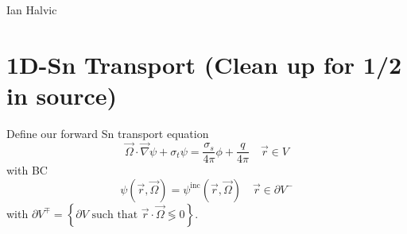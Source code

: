 \documentclass{article}
\newcommand{\vr}{\vec{r}}
\newcommand{\vO}{\vec{\Omega}}
\newcommand{\vgrad}{\vec{\nabla}}
\begin{document}
\begin{center}
Ian Halvic \\
\end{center}

\section{1D-Sn Transport (Clean up for 1/2 in source)}

Define our forward Sn transport equation
\[
\vO \cdot \vgrad \psi + \sigma_t \psi = \frac{\sigma_s}{4 \pi} \phi + \frac{q}{4 \pi} \quad \vr \in V
\]
with BC 
\[
\psi(\vr,\vO) = \psi^{\text{inc}}(\vr,\vO) \quad \vr \in \partial V^-
\]
with $\partial V^{\mp}=\left\{ \partial V \text{ such that } \vr \cdot \vO \lessgtr 0 \right\}$.
\end{document}
